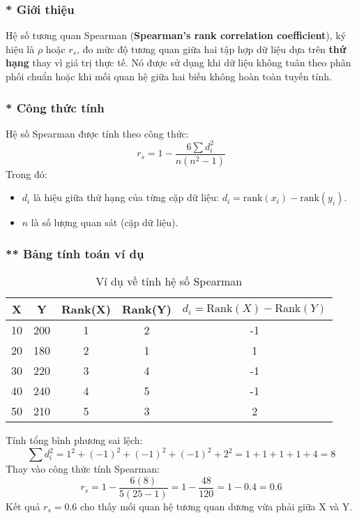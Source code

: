 \subsubsection{* Giới thiệu}
Hệ số tương quan Spearman (\textbf{Spearman's rank correlation coefficient}), ký hiệu là $\rho$ hoặc $r_s$, đo mức độ tương quan giữa hai tập hợp dữ liệu dựa trên \textbf{thứ hạng} thay vì giá trị thực tế. Nó được sử dụng khi dữ liệu không tuân theo phân phối chuẩn hoặc khi mối quan hệ giữa hai biến không hoàn toàn tuyến tính.

\subsubsection{* Công thức tính}
Hệ số Spearman được tính theo công thức:
\begin{equation}
    r_s = 1 - \frac{6 \sum d_i^2}{n(n^2 - 1)}
\end{equation}
Trong đó:
\begin{itemize}
    \item $d_i$ là hiệu giữa thứ hạng của từng cặp dữ liệu: $d_i = \text{rank}(x_i) - \text{rank}(y_i)$.
    \item $n$ là số lượng quan sát (cặp dữ liệu).
\end{itemize}

\subsubsection{** Bảng tính toán ví dụ}
\begin{table}[h]
    \centering
    \begin{tabular}{ccccc}
        \toprule
        X & Y & Rank(X) & Rank(Y) & $d_i = \text{Rank}(X) - \text{Rank}(Y)$ \\
        \midrule
        10 & 200 & 1 & 2 & -1 \\
        20 & 180 & 2 & 1 & 1 \\
        30 & 220 & 3 & 4 & -1 \\
        40 & 240 & 4 & 5 & -1 \\
        50 & 210 & 5 & 3 & 2 \\
        \bottomrule
    \end{tabular}
    \caption{Ví dụ về tính hệ số Spearman}
    \label{tab:spearman_example}
\end{table}

Tính tổng bình phương sai lệch:
\begin{equation}
    \sum d_i^2 = 1^2 + (-1)^2 + (-1)^2 + (-1)^2 + 2^2 = 1 + 1 + 1 + 1 + 4 = 8
\end{equation}
Thay vào công thức tính Spearman:
\begin{equation}
    r_s = 1 - \frac{6(8)}{5(25 - 1)} = 1 - \frac{48}{120} = 1 - 0.4 = 0.6
\end{equation}
Kết quả $r_s = 0.6$ cho thấy mối quan hệ tương quan dương vừa phải giữa X và Y.

